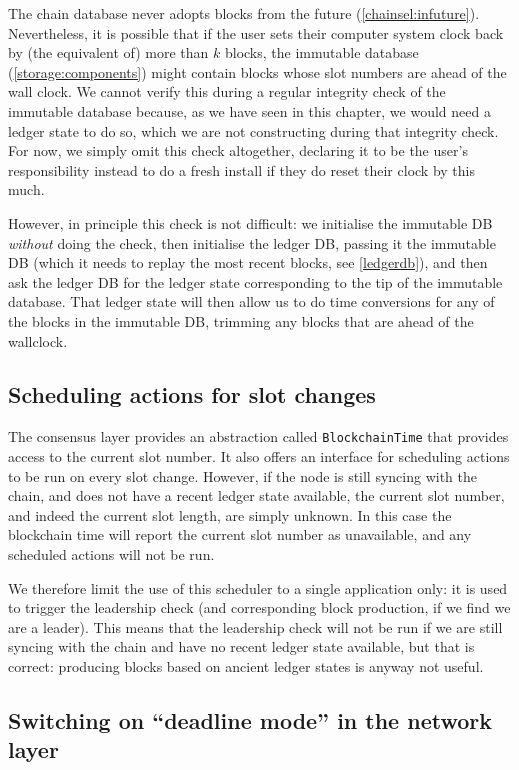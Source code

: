 The chain database never adopts blocks from the future
(\cref{chainsel:infuture}). Nevertheless, it is possible that if the user sets
their computer system clock back by (the equivalent of) more than $k$ blocks,
the immutable database (\cref{storage:components}) might contain blocks
whose slot numbers are ahead of the wall clock. We cannot verify this during a
regular integrity check of the immutable database because, as we have seen in
this chapter, we would need a ledger state to do so, which we are not
constructing during that integrity check. For now, we simply omit this check
altogether, declaring it to be the user's responsibility instead to do a
fresh install if they do reset their clock by this much.

However, in principle this check is not difficult: we initialise the immutable
DB \emph{without} doing the check, then initialise the ledger DB, passing it the
immutable DB (which it needs to replay the most recent blocks, see
\cref{ledgerdb}), and then ask the ledger DB for the ledger state
corresponding to the tip of the immutable database. That ledger state will then
allow us to do time conversions for any of the blocks in the immutable DB,
trimming any blocks that are ahead of the wallclock.

\subsection{Scheduling actions for slot changes}
\label{time:scheduling-actions}

The consensus layer provides an abstraction called \lstinline!BlockchainTime!
that provides access to the current slot number. It also offers an interface
for scheduling actions to be run on every slot change. However, if the node
is still syncing with the chain, and does not have a recent ledger state
available, the current slot number, and indeed the current slot length,
are simply unknown. In this case the blockchain time will report the current
slot number as unavailable, and any scheduled actions will not be run.

We therefore limit the use of this scheduler to a single application only:
it is used to trigger the leadership check (and corresponding block
production, if we find we are a leader). This means that the leadership
check will not be run if we are still syncing with the chain and have no
recent ledger state available, but that is correct: producing blocks based on
ancient ledger states is anyway not useful.

\subsection{Switching on ``deadline mode'' in the network layer}

